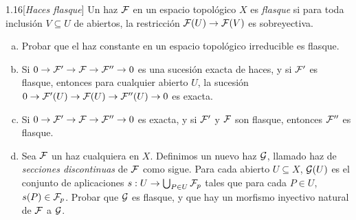 \documentclass[twoside]{article}
\begin{document}
%
\begin{ejercicio}{1.16}[\emph{Haces flasque}]
Un haz $\mathcal{F}$ en un espacio topológico $X$ es \emph{flasque} si para toda inclusión $V\subseteq U$ de abiertos, la restricción $\mathcal{F}(U)\to\mathcal{F}(V)$ es sobreyectiva.
\begin{enumerate}[(a)]
\item Probar que el haz constante en un espacio topológico irreducible es flasque.
\item Si $0\to\mathcal{F}'\to\mathcal{F}\to\mathcal{F}''\to 0$ es una sucesión exacta de haces, y si $\mathcal{F}'$ es flasque, entonces para cualquier abierto $U$, la sucesión $0\to\mathcal{F}'(U)\to\mathcal{F}(U)\to\mathcal{F}''(U)\to 0$ es exacta. 
\item Si $0\to\mathcal{F}'\to\mathcal{F}\to\mathcal{F}''\to 0$ es exacta, y si $\mathcal{F}'$ y $\mathcal{F}$ son flasque, entonces $\mathcal{F}''$ es flasque. 
\item Sea $\mathcal{F}$ un haz cualquiera en $X$. Definimos un nuevo haz $\mathcal{G}$, llamado haz de \emph{secciones discontinuas} de $\mathcal{F}$ como sigue. Para cada abierto $U\subseteq X$, $\mathcal{G}(U)$ es el conjunto de aplicaciones $s:U\to \bigcup_{P\in U}\mathcal{F}_p$ tales que para cada $P\in U$, $s(P)\in \mathcal{F}_p$. Probar que $\mathcal{G}$ es flasque, y que hay un morfismo inyectivo natural de $\mathcal{F}$ a $\mathcal{G}$. 
\end{enumerate} 
\end{ejercicio}
\end{document}
